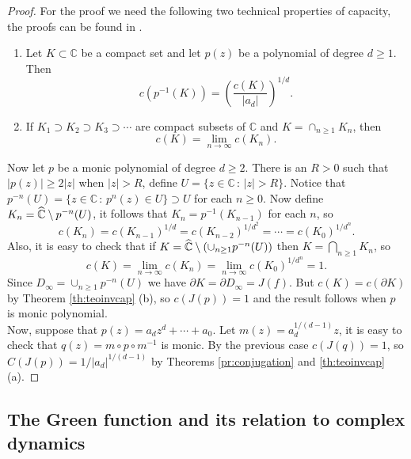 \begin{proof}
For the proof we need the following two technical properties of capacity, the proofs can be found in \cite{ransford}.

\begin{enumerate}
\item Let $K\subset \mathbb{C}$ be a compact set and let $p(z)$ be a polynomial of degree $d\geq 1$. Then
$$c(p^{-1}(K)) = \left( \frac{c(K)}{|a_d|}\right)^{1/d}.$$ 
\item If $K_1 \supset K_2 \supset K_3\supset \cdots$ are compact subsets of $\mathbb{C}$ and $K = \cap_{n\geq 1} K_n$, then 
$$c(K) = \lim_{n\rightarrow \infty} c(K_n).$$
\end{enumerate}

Now let $p$ be a monic polynomial of degree $d\geq 2$. There is an $R>0$ such that $|p(z)|\geq 2|z|$ when $|z|>R$, define $U= \{z\in \mathbb{C}\,:\, |z|>R\}$. Notice that $p^{-n}(U)= \{ z\in \mathbb{C}\,:\, p^n(z)\in U\} \supset U$ for each $n\geq 0$. Now define $K_n = \widehat{\mathbb{C}} \setminus p^{-n}(U)$, it follows that $K_n = p^{-1}(K_{n-1})$ for each $n$, so 
$$c(K_n) = c(K_{n-1})^{1/d} = c(K_{n-2})^{1/d^2}= \cdots = c(K_0)^{1/d^n}.$$ 
Also, it is easy to check that if $K = \widehat{\mathbb{C}}\setminus(\cup_{n\geq 1} p^{-n}(U))$ then $K = \bigcap_{n\geq 1} K_n $, so 
$$c(K) = \lim_{n\rightarrow \infty} c(K_n) = \lim_{n\rightarrow \infty} c(K_0)^{1/d^n} = 1.$$
Since $D_\infty = \cup_{n\geq 1} p^{-n}(U)$ we have $\partial K = \partial D_\infty = J(f)$. But $c(K) = c(\partial K)$ by Theorem \ref{th:teoinvcap} (b), so $c(J(p))=1$ and the result follows when $p$ is monic polynomial.\\

Now, suppose that $p(z) = a_dz^d+\cdots + a_0$. Let $m(z) = a_d^{1/(d-1)}z$, it is easy to check that $q(z) = m\circ p\circ m^{-1}$ is monic. By the previous case $c(J(q))=1$, so $C(J(p))=1/|a_d|^{1/(d-1)}$ by Theorems \ref{pr:conjugation} and \ref{th:teoinvcap} (a).
\end{proof}

\subsection{The Green function and its relation to complex dynamics}\label{subsectionn}

